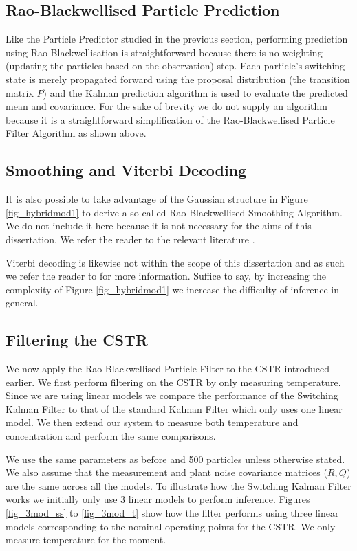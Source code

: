 \documentclass[../masters.tex]{subfiles}
\begin{document}
\subsection{Rao-Blackwellised Particle Prediction}
Like the Particle Predictor studied in the previous section, performing prediction using Rao-Blackwellisation is straightforward because there is no weighting (updating the particles based on the observation) step. Each particle's switching state is merely propagated forward using the proposal distribution (the transition matrix $P$) and the Kalman prediction algorithm is used to evaluate the predicted mean and covariance. For the sake of brevity we do not supply an algorithm because it is a straightforward simplification of the Rao-Blackwellised Particle Filter Algorithm as shown above.

\subsection{Smoothing and Viterbi Decoding}
It is also possible to take advantage of the Gaussian structure in Figure \ref{fig_hybridmod1} to derive a so-called Rao-Blackwellised Smoothing Algorithm. We do not include it here because it is not necessary for the aims of this dissertation. We refer the reader to the relevant literature \cite{chen}\cite{doucet}. 

Viterbi decoding is likewise not within the scope of this dissertation and as such we refer the reader to \cite{murphy1} for more information. Suffice to say, by increasing the complexity of Figure \ref{fig_hybridmod1} we increase the difficulty of inference in general.

\subsection{Filtering the CSTR}
We now apply the Rao-Blackwellised Particle Filter to the CSTR introduced earlier. We first perform filtering on the CSTR by only measuring temperature. Since we are using linear models we compare the performance of the Switching Kalman Filter to that of the standard Kalman Filter which only uses one linear model. We then extend our system to measure both temperature and concentration and perform the same comparisons.

We use the same parameters as before and 500 particles unless otherwise stated. We also assume that the measurement and plant noise covariance matrices ($R,Q$) are the same across all the models. To illustrate how the Switching Kalman Filter works we initially only use 3 linear models to perform inference. Figures \ref{fig_3mod_ss} to \ref{fig_3mod_t} show how  the filter performs using three linear models corresponding to the nominal operating points for the CSTR. We only measure temperature for the moment.
\end{document}

